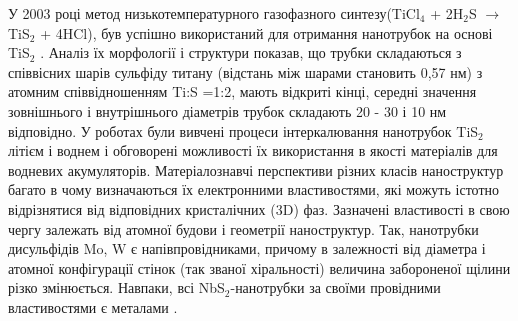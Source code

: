 У 2003 році метод низькотемпературного газофазного синтезу(TiCl$_4$ + 2H$_2$S $\rightarrow$ TiS$_2$ + 4HCl), був успішно використаний для отримання нанотрубок на основі TiS$_2$ \cite{nanotube}. Аналіз їх морфології і структури показав, що трубки складаються з співвісних шарів сульфіду титану (відстань між шарами становить 0,57 нм) з атомним співвідношенням Ti:S =1:2, мають відкриті кінці, середні значення зовнішнього і внутрішнього діаметрів трубок складають  20 - 30 і  10 нм відповідно. У роботах \cite{nanotube2,nanotube3} були вивчені процеси інтеркалювання нанотрубок TiS$_2$ літієм і воднем і обговорені можливості їх використання в якості матеріалів для водневих акумуляторів. Матеріалознавчі перспективи різних класів наноструктур багато в чому визначаються їх електронними властивостями, які можуть істотно відрізнятися від відповідних кристалічних (3D) фаз. Зазначені властивості в свою чергу залежать від атомної будови і геометрії наноструктур. Так, нанотрубки дисульфідів Mo, W є напівпровідниками, причому в залежності від діаметра і атомної конфігурації стінок (так званої хіральності) величина забороненої щілини різко змінюється. Навпаки, всі NbS$_2$-нанотрубки за своїми провідними властивостями є металами \cite{nanotube4,nanotube5,nanotube6}.
